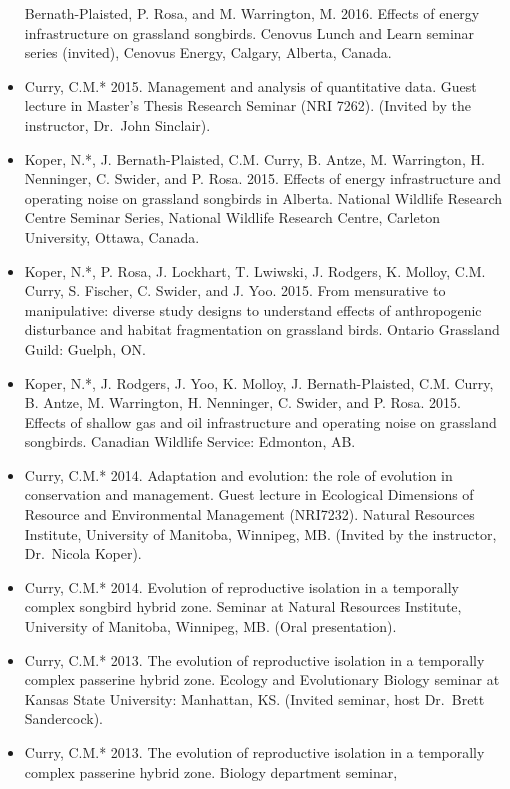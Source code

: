 \documentclass[
  letterpaper,
  DIV=11,
  numbers=noendperiod,
  oneside]{scrreprt}
\begin{document}
\begin{itemize}
  Bernath-Plaisted, P. Rosa, and M. Warrington, M. 2016. Effects of
  energy infrastructure on grassland songbirds. Cenovus Lunch and Learn
  seminar series (invited), Cenovus Energy, Calgary, Alberta, Canada.
\item
  Curry, C.M.* 2015. Management and analysis of quantitative data. Guest
  lecture in Master's Thesis Research Seminar (NRI 7262). (Invited by
  the instructor, Dr.~John Sinclair).
\item
  Koper, N.*, J. Bernath-Plaisted, C.M. Curry, B. Antze, M. Warrington,
  H. Nenninger, C. Swider, and P. Rosa. 2015. Effects of energy
  infrastructure and operating noise on grassland songbirds in Alberta.
  National Wildlife Research Centre Seminar Series, National Wildlife
  Research Centre, Carleton University, Ottawa, Canada.
\item
  Koper, N.*, P. Rosa, J. Lockhart, T. Lwiwski, J. Rodgers, K. Molloy,
  C.M. Curry, S. Fischer, C. Swider, and J. Yoo. 2015. From mensurative
  to manipulative: diverse study designs to understand effects of
  anthropogenic disturbance and habitat fragmentation on grassland
  birds. Ontario Grassland Guild: Guelph, ON.
\item
  Koper, N.*, J. Rodgers, J. Yoo, K. Molloy, J. Bernath-Plaisted, C.M.
  Curry, B. Antze, M. Warrington, H. Nenninger, C. Swider, and P. Rosa.
  2015. Effects of shallow gas and oil infrastructure and operating
  noise on grassland songbirds. Canadian Wildlife Service: Edmonton, AB.
\item
  Curry, C.M.* 2014. Adaptation and evolution: the role of evolution in
  conservation and management. Guest lecture in Ecological Dimensions of
  Resource and Environmental Management (NRI7232). Natural Resources
  Institute, University of Manitoba, Winnipeg, MB. (Invited by the
  instructor, Dr.~Nicola Koper).
\item
  Curry, C.M.* 2014. Evolution of reproductive isolation in a temporally
  complex songbird hybrid zone. Seminar at Natural Resources Institute,
  University of Manitoba, Winnipeg, MB. (Oral presentation).
\item
  Curry, C.M.* 2013. The evolution of reproductive isolation in a
  temporally complex passerine hybrid zone. Ecology and Evolutionary
  Biology seminar at Kansas State University: Manhattan, KS. (Invited
  seminar, host Dr.~Brett Sandercock).
\item
  Curry, C.M.* 2013. The evolution of reproductive isolation in a
  temporally complex passerine hybrid zone. Biology department seminar,

\end{itemize}
\end{document}
